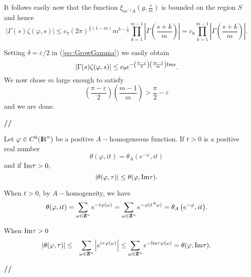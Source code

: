 \documentclass[12pt,a4paper]{amsart}
\begin{document}
{It follows easily now that the function
${{\xi}_{{m}^{-1}{A}}\left({g},{\frac{s}{m}}\right)}$
is bounded on the region ${S}$
and hence
\begin{equation}\nonumber
{\left|{\Gamma({s}){\zeta}({\varphi},{s})}\right|}
\leq
{c}_7
(2\pi)^{\frac{1}{2}(1-{m})}
{m}^{{b}-\frac{1}{2}}
\prod_{{k}=1}^{{m}-1}
{\left|{\Gamma\left(\frac{{s}+{k}}{m}\right)}\right|}
={c}_8
\prod_{{k}=1}^{{m}-1}
{\left|{\Gamma\left(\frac{{s}+{k}}{m}\right)}\right|}.
\end{equation}

Setting ${\delta}={\varepsilon}/2$ in (\ref{eq::GrowGamma}) we easily obtain
\begin{equation}\nonumber
{\left|{\Gamma({s}){\zeta}({\varphi},{s})}\right|}
\leq
{c}_9
e^{-\left(\frac{\pi-{\varepsilon}}{2}\right)
	  \left(\frac{{m}-1}{m}\right)
	  {\mathop{\rm Im}\nolimits}{s}}.
\end{equation}
We now chose ${m}$ large enough to satisfy
\begin{equation}\nonumber
\left(\frac{\pi-{\varepsilon}}{2}\right)
	  \left(\frac{{m}-1}{m}\right)
>\frac{\pi}{2}-{\varepsilon}
\end{equation}
and we are done.
{{\bf //}\par\smallskip}

\begin{proposition}
Let ${\varphi}\in C^0({{\rm I\kern-.185em R}}^{n})$
be a positive ${A}-$homogeneous function.
If ${t}>0$ is a positive real number
\begin{equation}\nonumber
	\theta({\varphi},i{t})
	={{\theta}_{{A}}\left({e^{-{\varphi}}},{i{t}}\right)}
\end{equation}
and if ${\mathop{\rm Im}\nolimits}\tau>0$,
\begin{equation}\nonumber
	{\left|{\theta({\varphi},\tau)}\right|}
	\leq\theta({\varphi},{\mathop{\rm Im}\nolimits}\tau).
\end{equation}
\end{proposition}

{\removelastskip\par\medskip\goodbreak{}}
When ${t}>0$, by ${A}-$homogeneity, we have
\begin{equation}\nonumber
	\theta({\varphi},i{t})
	=\sum_{{\omega}\in{{\bf Z}}^{n}}e^{-{t}{\varphi}({\omega})}
	=\sum_{{\omega}\in{{\bf Z}}^{n}}e^{-{\varphi}({t}^{A}{\omega})}
	={{\theta}_{{A}}\left({e^{-{\varphi}}},{i{t}}\right)}.
\end{equation}

When ${\mathop{\rm Im}\nolimits}\tau>0$
\begin{eqnarray}\nonumber
	{\left|{\theta({\varphi},\tau)}\right|}&\leq&
	\sum_{{\omega}\in{{\bf Z}}^{n}}{\left|{e^{i\tau{\varphi}({\omega})}}\right|}
	\leq
	\sum_{{\omega}\in{{\bf Z}}^{n}}e^{-{\mathop{\rm Im}\nolimits}\tau{\varphi}({\omega})}
	=\theta({\varphi},{\mathop{\rm Im}\nolimits}\tau).
\end{eqnarray}
{{\bf //}\par\smallskip}

}
\end{document}
